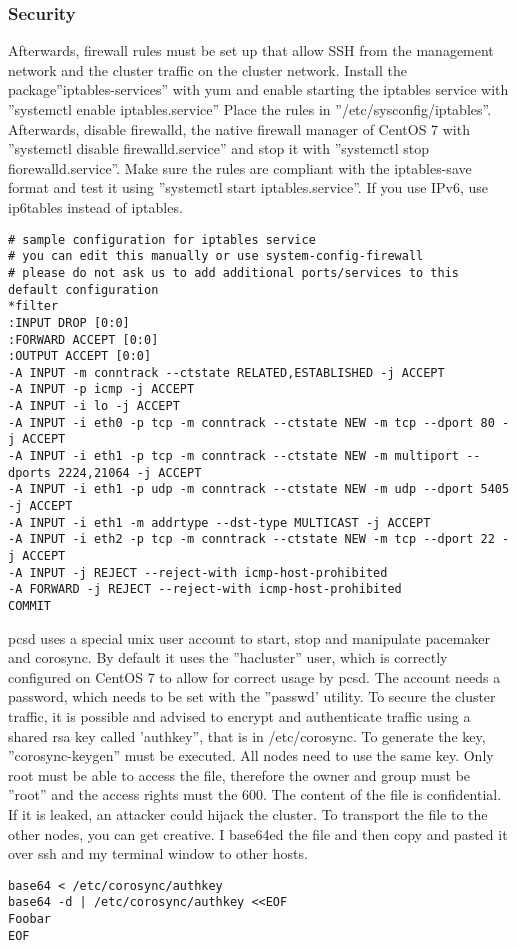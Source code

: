\subsubsection{Security}
Afterwards, firewall rules must be set up that allow SSH from the management network
and the cluster traffic on the cluster network. Install the package''iptables-services'' with
yum and enable starting the iptables service with ''systemctl enable iptables.service''
Place the rules in ''/etc/sysconfig/iptables''. 
Afterwards, disable firewalld, the native firewall manager of CentOS 7 with ''systemctl disable firewalld.service''
and stop it with ''systemctl stop fiorewalld.service''.
Make sure the rules are compliant with the iptables-save format and test it using 
''systemctl start iptables.service''. If you use IPv6, use ip6tables instead of iptables.
\begin{lstlisting}
# sample configuration for iptables service
# you can edit this manually or use system-config-firewall
# please do not ask us to add additional ports/services to this default configuration
*filter
:INPUT DROP [0:0]
:FORWARD ACCEPT [0:0]
:OUTPUT ACCEPT [0:0]
-A INPUT -m conntrack --ctstate RELATED,ESTABLISHED -j ACCEPT
-A INPUT -p icmp -j ACCEPT
-A INPUT -i lo -j ACCEPT
-A INPUT -i eth0 -p tcp -m conntrack --ctstate NEW -m tcp --dport 80 -j ACCEPT
-A INPUT -i eth1 -p tcp -m conntrack --ctstate NEW -m multiport --dports 2224,21064 -j ACCEPT
-A INPUT -i eth1 -p udp -m conntrack --ctstate NEW -m udp --dport 5405 -j ACCEPT
-A INPUT -i eth1 -m addrtype --dst-type MULTICAST -j ACCEPT
-A INPUT -i eth2 -p tcp -m conntrack --ctstate NEW -m tcp --dport 22 -j ACCEPT
-A INPUT -j REJECT --reject-with icmp-host-prohibited
-A FORWARD -j REJECT --reject-with icmp-host-prohibited
COMMIT
\end{lstlisting}
pcsd uses a special unix user account to start, stop and manipulate pacemaker
and corosync. By default it uses the ''hacluster'' user, which is correctly
configured on CentOS 7 to allow for correct usage by pcsd.
The account needs a password, which needs to be set with the ''passwd' utility.
To secure the cluster traffic, it is possible and advised to encrypt and authenticate
traffic using a shared rsa key called 'authkey'', that is in /etc/corosync.
To generate the key, ''corosync-keygen'' must be executed. All nodes need to use the same key.
Only root must be able to access the file, therefore the owner and group must be ''root''
and the access rights must the 600. The content of the file is confidential. If it is leaked,
an attacker could hijack the cluster. To transport the file to the other nodes, you
can get creative. I base64ed the file and then copy and pasted it over ssh and my
terminal window to other hosts.
\begin{lstlisting}
base64 < /etc/corosync/authkey
base64 -d | /etc/corosync/authkey <<EOF 
Foobar
EOF
\end{lstlisting}
